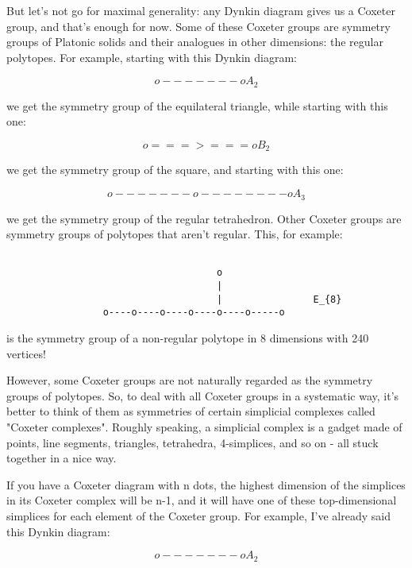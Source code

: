 But let's not go for maximal generality: any Dynkin diagram gives us a
Coxeter group, and that's enough for now.   Some of these Coxeter groups
are symmetry groups of Platonic solids and their analogues in other
dimensions: the regular polytopes.  For example, starting with this
Dynkin diagram:


$$

                           o-------o                  A_{2}
$$
    
we get the symmetry group of the equilateral triangle, while starting
with this one:


$$

                           o===>===o                  B_{2}
$$
    
we get the symmetry group of the square, and starting with this one:



$$

                       o-------o--------o             A_{3}
$$
    
we get the symmetry group of the regular tetrahedron.  Other Coxeter
groups are symmetry groups of polytopes that aren't regular.   This, 
for example:


\begin{verbatim}

                                     o
                                     | 
                                     |                E_{8}
                 o----o----o----o----o----o-----o
\end{verbatim}
    
is the symmetry group of a non-regular polytope in 8 dimensions with 240 
vertices!   

However, some Coxeter groups are not naturally regarded as the symmetry
groups of polytopes.  So, to deal with all Coxeter groups in a
systematic way, it's better to think of them as symmetries of certain
simplicial complexes called "Coxeter complexes".  Roughly speaking, a
simplicial complex is a gadget made of points, line segments, triangles,
tetrahedra, 4-simplices, and so on - all stuck together in a nice way.

If you have a Coxeter diagram with n dots, the highest dimension of  the
simplices in its Coxeter complex will be n-1, and it will have one of
these top-dimensional simplices for each element of the Coxeter group. 
For example, I've already said this Dynkin diagram:  


$$

                           o-------o                   A_{2}
$$
    
